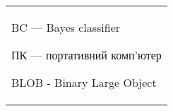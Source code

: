 
\begin{tabular}{l}
	BC — Bayes classifier
	         					
	ПК — портативний комп'ютер
	
	BLOB - Binary Large Object
\end{tabular}